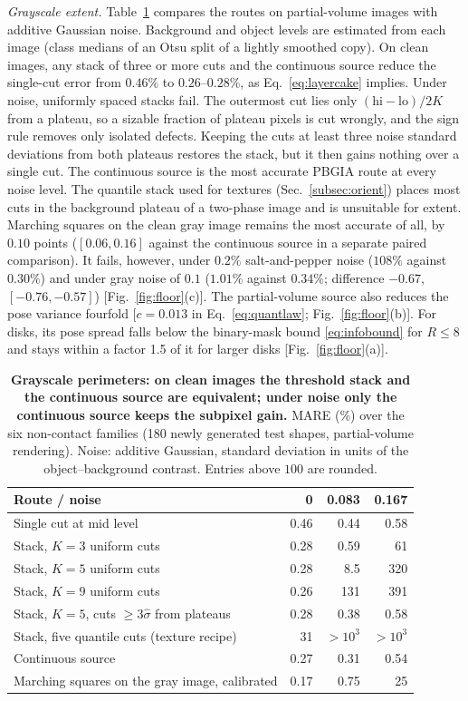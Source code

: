 \documentclass[11pt,a4paper]{article}
\begin{document}
\emph{Grayscale extent.} Table~\ref{tab:graycut} compares the routes on partial-volume images with additive Gaussian noise. Background and object levels are estimated from each image (class medians of an Otsu split of a lightly smoothed copy). On clean images, any stack of three or more cuts and the continuous source reduce the single-cut error from $0.46\%$ to $0.26$--$0.28\%$, as Eq.~\eqref{eq:layercake} implies. Under noise, uniformly spaced stacks fail. The outermost cut lies only $(\mathrm{hi}-\mathrm{lo})/2K$ from a plateau, so a sizable fraction of plateau pixels is cut wrongly, and the sign rule removes only isolated defects. Keeping the cuts at least three noise standard deviations from both plateaus restores the stack, but it then gains nothing over a single cut. The continuous source is the most accurate PBGIA route at every noise level. The quantile stack used for textures (Sec.~\ref{subsec:orient}) places most cuts in the background plateau of a two-phase image and is unsuitable for extent. Marching squares on the clean gray image remains the most accurate of all, by $0.10$ points ($[0.06,0.16]$ against the continuous source in a separate paired comparison). It fails, however, under $0.2\%$ salt-and-pepper noise ($108\%$ against $0.30\%$) and under gray noise of $0.1$ ($1.01\%$ against $0.34\%$; difference $-0.67$, $[-0.76,-0.57]$) [Fig.~\ref{fig:floor}(c)]. The partial-volume source also reduces the pose variance fourfold [$c=0.013$ in Eq.~\eqref{eq:quantlaw}; Fig.~\ref{fig:floor}(b)]. For disks, its pose spread falls below the binary-mask bound \eqref{eq:infobound} for $R\le8$ and stays within a factor 1.5 of it for larger disks [Fig.~\ref{fig:floor}(a)].

\begin{table}[h]
\centering\caption{\textbf{Grayscale perimeters: on clean images the threshold stack and the continuous source are equivalent; under noise only the continuous source keeps the subpixel gain.} MARE (\%) over the six non-contact families (180 newly generated test shapes, partial-volume rendering). Noise: additive Gaussian, standard deviation in units of the object--background contrast. Entries above $100$ are rounded.}\label{tab:graycut}
\small\begin{tabular}{@{}lrrr@{}}\toprule
Route / noise & 0 & 0.083 & 0.167\\\midrule
Single cut at mid level & 0.46 & 0.44 & 0.58\\
Stack, $K=3$ uniform cuts & 0.28 & 0.59 & 61\\
Stack, $K=5$ uniform cuts & 0.28 & 8.5 & 320\\
Stack, $K=9$ uniform cuts & 0.26 & 131 & 391\\
Stack, $K=5$, cuts $\ge3\hat\sigma$ from plateaus & 0.28 & 0.38 & 0.58\\
Stack, five quantile cuts (texture recipe) & 31 & $>10^3$ & $>10^3$\\
Continuous source & 0.27 & 0.31 & 0.54\\
Marching squares on the gray image, calibrated & 0.17 & 0.75 & 25\\\bottomrule
\end{tabular}
\end{table}
\end{document}
